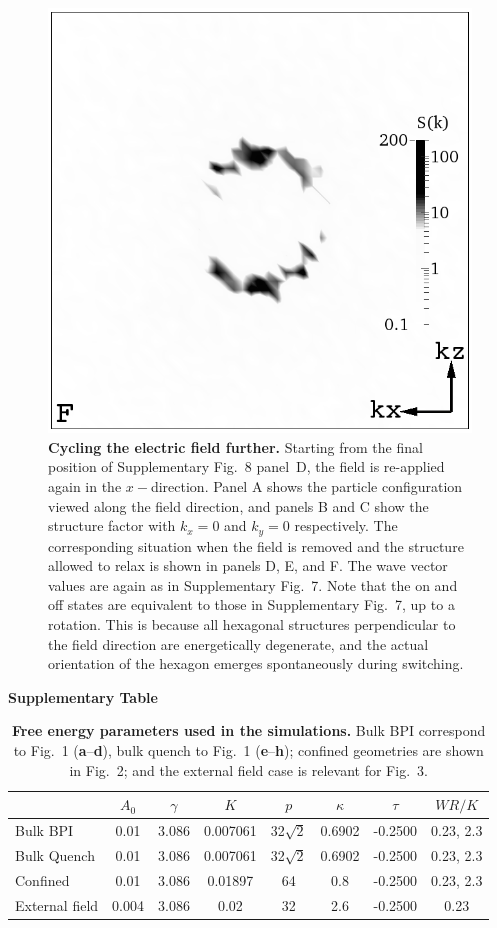 \documentclass[12pt,twoside]{article}
\begin{document}
\begin{figure}[!h]
\begin{center}
\includegraphics[width=0.32\columnwidth]{sq_y_run1347.png}
\end{center}
\caption{\textbf{Cycling the electric field further.}
Starting from the final
position of Supplementary Fig.~8 panel~D, the field is re-applied
again in the $x-$direction. Panel A shows the particle configuration
viewed along the field direction, and panels B and C show the structure
factor with $k_x = 0$ and $k_y = 0$ respectively. The corresponding
situation when the field is removed and the structure allowed to relax
is shown in panels D, E, and F. The wave vector values are again as
in Supplementary Fig.~7. Note that the on and off states are 
equivalent to those in Supplementary Fig.~7, up to a rotation.
This is because all hexagonal structures perpendicular to the field
direction are energetically degenerate,
and the actual orientation of the hexagon emerges spontaneously during
switching. }
\end{figure}


\vfill\pagebreak


{\bf Supplementary Table}

\begin{table}[h]
\begin{center}
\begin{tabular}{|l|c|c|c|c|c|c|c|}
\hline
         & $A_0$ & $\gamma$ & $K$ & $p$ & $\kappa$ & $\tau$ & $WR/K$\\
\hline 
Bulk BPI & 0.01 & 3.086 & 0.007061 & 32$\sqrt{2}$ & 0.6902 & -0.2500 &
0.23, 2.3\\
\hline
Bulk Quench & 0.01 & 3.086 & 0.007061 & 32$\sqrt{2}$ & 0.6902 & -0.2500 &
0.23, 2.3 \\
\hline
Confined & 0.01 & 3.086 & 0.01897 & 64 & 0.8 & -0.2500 & 0.23, 2.3\\
\hline
External field & 0.004& 3.086 & 0.02 & 32 & 2.6 & -0.2500 & 0.23\\ 
\hline
\end{tabular}
\end{center}
\caption{\textbf{Free energy parameters used in the simulations.} Bulk BPI
correspond to Fig.~1 (\textbf{a}--\textbf{d}), bulk quench to
Fig.~1 (\textbf{e}--\textbf{h}); confined
geometries are shown in Fig.~2; and the external field case is
relevant for Fig.~3.}
\label{table:params}
\end{table}
\end{document}
